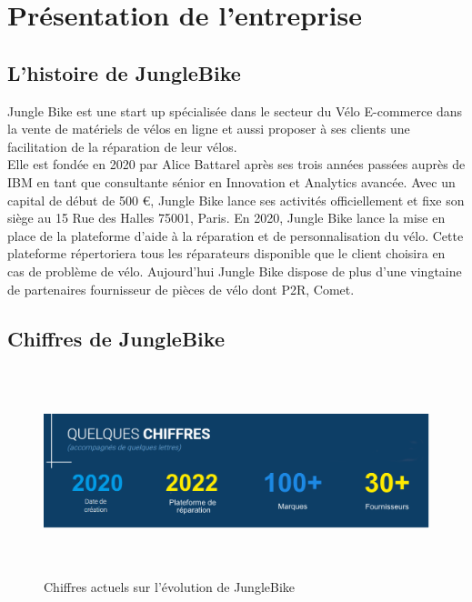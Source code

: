 \chapter{Présentation de l'entreprise}
\minitoc
\newpage
 
\section{L’histoire de JungleBike}
Jungle Bike est une start up spécialisée dans le secteur du Vélo E-commerce dans la vente de matériels de vélos en ligne et aussi proposer à ses clients une facilitation de la réparation de leur vélos. \\
Elle est fondée en 2020 par Alice Battarel après ses trois années passées auprès de IBM en tant que consultante sénior en Innovation et Analytics avancée. Avec un capital de début de 500 €, Jungle Bike lance ses activités officiellement et fixe son siège au 15 Rue des Halles 75001, Paris. En 2020, Jungle Bike lance la mise en place de la plateforme d’aide à la réparation et de personnalisation du vélo. Cette plateforme répertoriera tous les réparateurs disponible que le client choisira en cas de problème de vélo.
Aujourd’hui Jungle Bike dispose de plus d’une vingtaine de partenaires fournisseur de pièces de vélo dont P2R, Comet.

\newpage
\section{Chiffres de JungleBike}
\begin{figure}[h]
\begin{center}
\includegraphics[width=15cm,height=6cm]{images/chiffres_jb.png}
\caption[Chiffres actuels sur l'évolution de JungleBike]{Chiffres actuels sur l'évolution de JungleBike}
\label{monlabel}
\end{center}
\end{figure}

